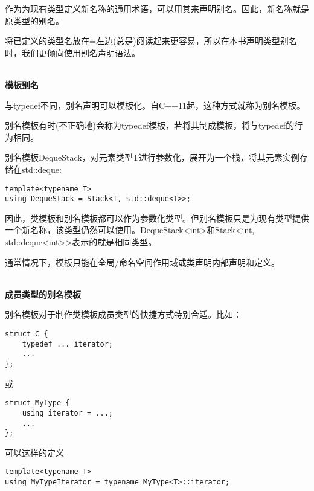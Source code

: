 作为为现有类型定义新名称的通用术语，可以用其来声明别名。因此，新名称就是原类型的别名。

将已定义的类型名放在=左边(总是)阅读起来更容易，所以在本书声明类型别名时，我们更倾向使用别名声明语法。

\hspace*{\fill} \\ %
\noindent
\textbf{模板别名}

与typedef不同，别名声明可以模板化。自C++11起，这种方式就称为别名模板。

\begin{tcolorbox}[colback=webgreen!5!white,colframe=webgreen!75!black]
\hspace*{0.75cm}别名模板有时(不正确地)会称为typedef模板，若将其制成模板，将与typedef的行为相同。
\end{tcolorbox}

别名模板DequeStack，对元素类型T进行参数化，展开为一个栈，将其元素实例存储在std::deque:

\begin{lstlisting}[style=styleCXX]
template<typename T>
using DequeStack = Stack<T, std::deque<T>>;
\end{lstlisting}

因此，类模板和别名模板都可以作为参数化类型。但别名模板只是为现有类型提供一个新名称，该类型仍然可以使用。DequeStack<int>和Stack<int, std::deque<int>>表示的就是相同类型。

通常情况下，模板只能在全局/命名空间作用域或类声明内部声明和定义。

\hspace*{\fill} \\ %
\noindent
\textbf{成员类型的别名模板}

别名模板对于制作类模板成员类型的快捷方式特别合适。比如：

\begin{lstlisting}[style=styleCXX]
struct C {
	typedef ... iterator;
	...
};
\end{lstlisting}

或

\begin{lstlisting}[style=styleCXX]
struct MyType {
	using iterator = ...;
	...
};
\end{lstlisting}

可以这样的定义

\begin{lstlisting}[style=styleCXX]
template<typename T>
using MyTypeIterator = typename MyType<T>::iterator;
\end{lstlisting}


